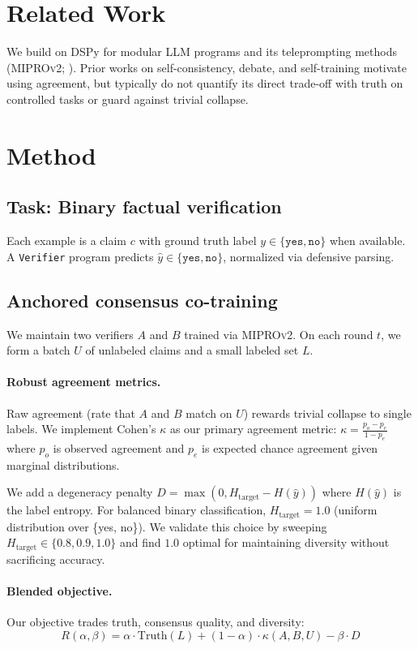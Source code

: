 \documentclass[11pt]{article}
\begin{document}
\section{Related Work}
We build on DSPy \citep{dspy} for modular LLM programs and its teleprompting methods (\textsc{MIPROv2}; \citealp{mipro}).
Prior works on self-consistency, debate, and self-training motivate using agreement, but typically do not quantify its direct trade-off with truth on controlled tasks or guard against trivial collapse.

\section{Method}
\subsection{Task: Binary factual verification}
Each example is a claim $c$ with ground truth label $y \in \{\texttt{yes}, \texttt{no}\}$ when available.
A \texttt{Verifier} program predicts $\hat{y} \in \{\texttt{yes}, \texttt{no}\}$, normalized via defensive parsing.

\subsection{Anchored consensus co-training}
We maintain two verifiers $A$ and $B$ trained via \textsc{MIPROv2}.
On each round $t$, we form a batch $U$ of unlabeled claims and a small labeled set $L$.

\paragraph{Robust agreement metrics.} 
Raw agreement (rate that $A$ and $B$ match on $U$) rewards trivial collapse to single labels.
We implement Cohen's $\kappa$ as our primary agreement metric: $\kappa = \frac{p_o - p_e}{1 - p_e}$ where $p_o$ is observed agreement and $p_e$ is expected chance agreement given marginal distributions.

We add a degeneracy penalty $D = \max(0, H_{\text{target}} - H(\hat{y}))$ where $H(\hat{y})$ is the label entropy.
For balanced binary classification, $H_{\text{target}} = 1.0$ (uniform distribution over \{yes, no\}).
We validate this choice by sweeping $H_{\text{target}} \in \{0.8, 0.9, 1.0\}$ and find $1.0$ optimal for maintaining diversity without sacrificing accuracy.

\paragraph{Blended objective.}
Our objective trades truth, consensus quality, and diversity:
\begin{equation}
R(\alpha, \beta) = \alpha \cdot \mathrm{Truth}(L) + (1-\alpha) \cdot \kappa(A,B,U) - \beta \cdot D
\end{equation}
\end{document}
